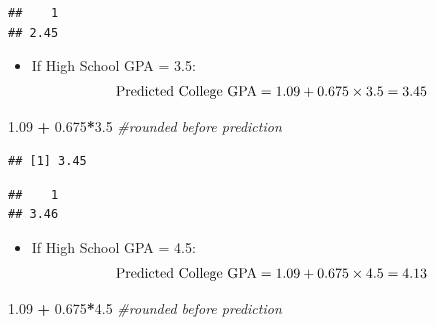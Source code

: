 \documentclass[]{book}
\newenvironment{Shaded}{\begin{snugshade}}{\end{snugshade}}
\newcommand{\CommentTok}[1]{\textcolor[rgb]{0.56,0.35,0.01}{\textit{#1}}}
\newcommand{\DataTypeTok}[1]{\textcolor[rgb]{0.13,0.29,0.53}{#1}}
\newcommand{\FloatTok}[1]{\textcolor[rgb]{0.00,0.00,0.81}{#1}}
\newcommand{\KeywordTok}[1]{\textcolor[rgb]{0.13,0.29,0.53}{\textbf{#1}}}
\newcommand{\NormalTok}[1]{#1}
\newcommand{\OperatorTok}[1]{\textcolor[rgb]{0.81,0.36,0.00}{\textbf{#1}}}
\newcommand{\StringTok}[1]{\textcolor[rgb]{0.31,0.60,0.02}{#1}}
\providecommand{\tightlist}{%
  \setlength{\itemsep}{0pt}\setlength{\parskip}{0pt}}
\begin{document}
\begin{verbatim}
##    1 
## 2.45
\end{verbatim}

\begin{itemize}
\tightlist
\item
  If High School GPA = 3.5:\\
  \[ \hbox{Predicted College GPA} = 1.09 + 0.675 \times 3.5 = 3.45 \]
\end{itemize}

\begin{Shaded}
\begin{Highlighting}[]
\FloatTok{1.09} \OperatorTok{+}\StringTok{ }\FloatTok{0.675}\OperatorTok{*}\FloatTok{3.5} \CommentTok{#rounded before prediction}
\end{Highlighting}
\end{Shaded}

\begin{verbatim}
## [1] 3.45
\end{verbatim}

\begin{Shaded}
\end{Shaded}

\begin{verbatim}
##    1 
## 3.46
\end{verbatim}

\begin{itemize}
\tightlist
\item
  If High School GPA = 4.5:\\
  \[ \hbox{Predicted College GPA} = 1.09 + 0.675 \times 4.5 = 4.13 \]
\end{itemize}

\begin{Shaded}
\begin{Highlighting}[]
\FloatTok{1.09} \OperatorTok{+}\StringTok{ }\FloatTok{0.675}\OperatorTok{*}\FloatTok{4.5} \CommentTok{#rounded before prediction}
\end{Highlighting}
\end{Shaded}
\end{document}
